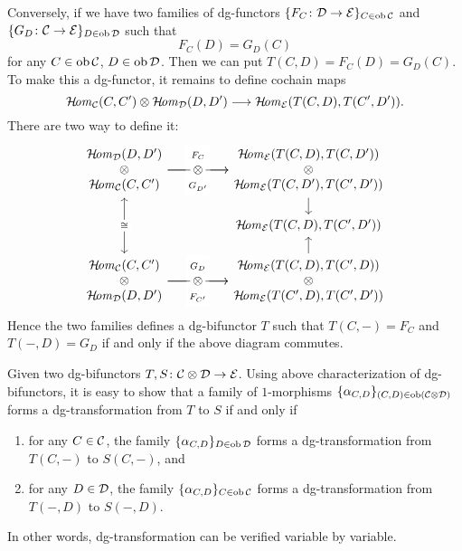 {Conversely, if we have two families of dg-functors 
$\{F_C\colon{\cal D}\to{\cal E}\}_{C\in\operatorname{ob}{\cal C}}$ and 
$\{G_D\colon{\cal C}\to{\cal E}\}_{D\in\operatorname{ob}{\cal D}}$ 
such that 
\[
F_C(D)=G_D(C)
\]
for any $C\in\operatorname{ob}{\cal C}$, $D\in\operatorname{ob}{\cal D}$. 
Then we can put $T(C,D)=F_C(D)=G_D(C)$. 
To make this a dg-functor, it remains to define cochain maps
\[
\operatorname{\mathcal{H}\!\mathit{om}}_{{\cal C}}(C,C')\otimes\operatorname{\mathcal{H}\!\mathit{om}}_{{\cal D}}(D,D')\longrightarrow\operatorname{\mathcal{H}\!\mathit{om}}_{{\cal E}}(T(C,D),T(C',D')).
\]
There are two way to define it:
\[
\begin{tikzcd}[column sep=huge, row sep=scriptsize]
{
\begin{matrix}
\HHom_{\Dd}(D,D')\\
\otimes\\
\HHom_{\Cc}(C,C')
\end{matrix}
}
\ar[r,"{
\begin{matrix}
F_{C}\\
\\
G_{D'}
\end{matrix}
}"description]
\ar[r,"\textstyle{\otimes}"description]
\ar[dd,leftrightarrow,"{\cong}"description]
&
{
\begin{matrix}
\HHom_{\Ee}(T(C,D),T(C,D')) \\
\otimes \\
\HHom_{\Ee}(T(C,D'),T(C',D'))
\end{matrix}
}\ar[d]\\
&\HHom_{\Ee}(T(C,D),T(C',D')) \\
{
\begin{matrix}
\HHom_{\Cc}(C,C')\\
\otimes\\
\HHom_{\Dd}(D,D')
\end{matrix}
}
\ar[r,"{
\begin{matrix}
G_D\\
\otimes\\
F_{C'}
\end{matrix}
}"description]
\ar[r,"\textstyle{\otimes}"description]
&
{
\begin{matrix}
\HHom_{\Ee}(T(C,D),T(C',D)) \\
\otimes \\
\HHom_{\Ee}(T(C',D),T(C',D'))
\end{matrix}
}\ar[u]
\end{tikzcd}
\]
Hence the two families defines a dg-bifunctor $T$ such that 
$T(C,-)=F_C$ and $T(-,D)=G_D$ if and only if the above diagram commutes.

Given two dg-bifunctors $T,S\colon {\cal C}\otimes{\cal D}\to{\cal E}$.
Using above characterization of dg-bifunctors, 
it is easy to show that 
a family of $1$-morphisms 
$\{\alpha_{C,D}\}_{(C,D)\in\operatorname{ob}({\cal C}\otimes{\cal D})}$ 
forms a dg-transformation from $T$ to $S$ if and only if 
\begin{enumerate}
\item 
for any $C\in{\cal C}$, 
the family $\{\alpha_{C,D}\}_{D\in\operatorname{ob}{\cal D}}$ 
forms a dg-transformation from $T(C,-)$ to $S(C,-)$, 
and 
\item
for any $D\in{\cal D}$, 
the family $\{\alpha_{C,D}\}_{C\in\operatorname{ob}{\cal C}}$ 
forms a dg-transformation from $T(-,D)$ to $S(-,D)$.
\end{enumerate}
In other words, dg-transformation can be verified 
variable by variable.
}
